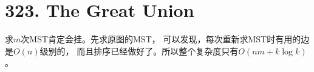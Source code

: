 \section{323. The Great Union}
求$m$次MST肯定会挂。先求原图的MST，
可以发现，每次重新求MST时有用的边是$O(n)$级别的，
而且排序已经做好了。所以整个复杂度只有$O(nm+k\log k)$。
